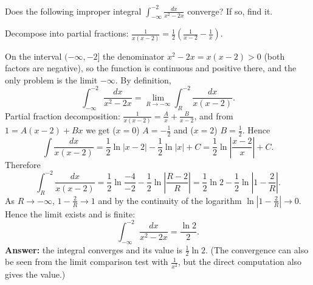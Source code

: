 
\begin{question}
Does the following improper integral $\displaystyle\int_{-\infty}^{-2}\frac{dx}{x^2-2x}$ converge? If so, find it.
\end{question}

\begin{hint}
Decompose into partial fractions: $\frac{1}{x(x-2)}=\frac12\left(\frac{1}{x-2}-\frac1x\right)$.
\end{hint}

\begin{solution}
On the interval $(-\infty,-2]$ the denominator $x^2-2x=x(x-2)>0$ (both factors are negative), so the function is continuous and positive there, and the only problem is the limit $-\infty$. By definition,
\[ \int_{-\infty}^{-2}\frac{dx}{x^2-2x} = \lim_{R\to-\infty}\int_R^{-2}\frac{dx}{x(x-2)}. \]
Partial fraction decomposition: $\frac{1}{x(x-2)}=\frac{A}{x}+\frac{B}{x-2}$, and from $1=A(x-2)+Bx$ we get ($x=0$) $A=-\frac12$ and ($x=2$) $B=\frac12$. Hence
\[ \int\frac{dx}{x(x-2)} = \frac12\ln|x-2|-\frac12\ln|x| + C = \frac12\ln\left|\frac{x-2}{x}\right| + C. \]
Therefore
\[ \int_R^{-2}\frac{dx}{x(x-2)} = \frac12\ln\frac{-4}{-2} - \frac12\ln\left|\frac{R-2}{R}\right| = \frac12\ln2-\frac12\ln\left|1-\frac2R\right|. \]
As $R\to-\infty$, $1-\frac2R\to1$ and by the continuity of the logarithm $\ln\left|1-\frac2R\right|\to0$. Hence the limit exists and is finite:
\[ \int_{-\infty}^{-2}\frac{dx}{x^2-2x} = \frac{\ln2}{2}. \]
\textbf{Answer:} the integral converges and its value is $\frac12\ln2$.
(The convergence can also be seen from the limit comparison test with $\frac1{x^2}$, but the direct computation also gives the value.)
\end{solution}

